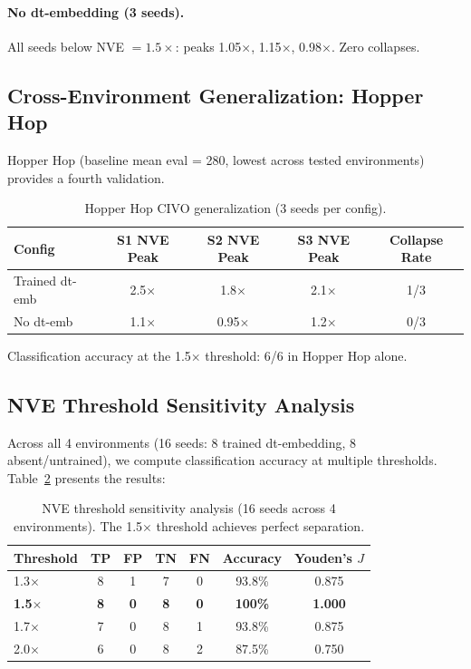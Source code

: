 \documentclass[10pt,letterpaper]{article}
\begin{document}
\paragraph{No dt-embedding (3 seeds).}
All seeds below NVE $= 1.5\times$: peaks 1.05$\times$, 1.15$\times$, 0.98$\times$. Zero collapses.

\subsection{Cross-Environment Generalization: Hopper Hop}
\label{sec:hopper}

Hopper Hop (baseline mean eval = 280, lowest across tested environments) provides a fourth validation.

\begin{table}[h]
\centering
\caption{Hopper Hop CIVO generalization (3 seeds per config).}
\label{tab:hopper}
\begin{tabular}{lcccc}
\toprule
Config & S1 NVE Peak & S2 NVE Peak & S3 NVE Peak & Collapse Rate \\
\midrule
Trained dt-emb & 2.5$\times$ & 1.8$\times$ & 2.1$\times$ & 1/3 \\
No dt-emb     & 1.1$\times$ & 0.95$\times$ & 1.2$\times$ & 0/3 \\
\bottomrule
\end{tabular}
\end{table}

Classification accuracy at the 1.5$\times$ threshold: 6/6 in Hopper Hop alone.

\subsection{NVE Threshold Sensitivity Analysis}
\label{sec:threshold}

Across all 4 environments (16 seeds: 8 trained dt-embedding, 8 absent/untrained), we compute classification accuracy at multiple thresholds. Table~\ref{tab:threshold} presents the results:

\begin{table}[h]
\centering
\caption{NVE threshold sensitivity analysis (16 seeds across 4 environments). The 1.5$\times$ threshold achieves perfect separation.}
\label{tab:threshold}
\begin{tabular}{lcccccc}
\toprule
Threshold & TP & FP & TN & FN & Accuracy & Youden's $J$ \\
\midrule
1.3$\times$ & 8 & 1 & 7 & 0 & 93.8\% & 0.875 \\
\textbf{1.5$\times$} & \textbf{8} & \textbf{0} & \textbf{8} & \textbf{0} & \textbf{100\%} & \textbf{1.000} \\
1.7$\times$ & 7 & 0 & 8 & 1 & 93.8\% & 0.875 \\
2.0$\times$ & 6 & 0 & 8 & 2 & 87.5\% & 0.750 \\
\bottomrule
\end{tabular}
\end{table}
\end{document}
